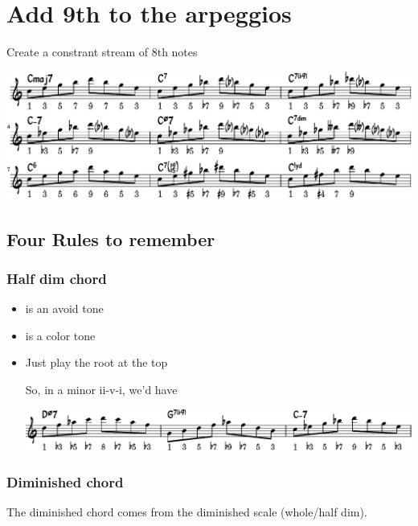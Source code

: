 \documentclass[11pt]{article}
\begin{document}
\section{Add 9th to the arpeggios}
\label{sec:orgaba9428}

Create a constrant stream of 8th notes

\begin{center}
\includegraphics[width=0.98\linewidth]{arpeggeio-to-9th.pdf}
\end{center}

\subsection{Four Rules to remember}
\label{sec:org980c06f}
\subsubsection{Half dim chord}
\label{sec:org1b81572}
\begin{itemize}
\item {} is an avoid tone
\item {} is a color tone
\item Just play the root at the top

So, in a minor ii-v-i, we'd have

\begin{center}
\includegraphics[width=0.98\linewidth]{arpeg-9th-half-dim.pdf}
\end{center}
\end{itemize}

\subsubsection{Diminished chord}
\label{sec:org79288b5}

The diminished chord comes from the diminished scale (whole/half dim).
\end{document}
